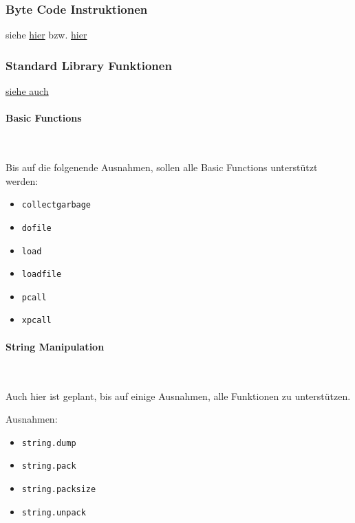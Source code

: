 \documentclass{article}
\let\oldparagraph\paragraph
\renewcommand{\paragraph}[1]{\oldparagraph{#1}\mbox{}\\}
\begin{document}
\subsubsection*{Byte Code Instruktionen}\hypertarget{byte-code-instruktionen}{}\label{byte-code-instruktionen}

siehe \href{https://www.lua.org/source/5.3/lopcodes.h.html}{hier}\newline
bzw. \href{https://github.com/dibyendumajumdar/ravi/blob/master/readthedocs/lua\_bytecode\_reference.rst}{hier}

\subsubsection*{Standard Library Funktionen}\hypertarget{standard-library-funktionen}{}\label{standard-library-funktionen}

\href{https://www.lua.org/manual/5.3/manual.html\#6}{siehe auch}

\paragraph{Basic Functions}\hypertarget{basic-functions}{}\label{basic-functions}

Bis auf die folgenende Ausnahmen, sollen alle Basic Functions unterstützt werden:

\begin{multicols}{2}
\begin{itemize}
\item \texttt{collectgarbage}
\item \texttt{dofile}
\item \texttt{load}
\item \texttt{loadfile}
\item \texttt{pcall}
\item \texttt{xpcall}
\end{itemize}
\end{multicols}

\pagebreak

\paragraph{String Manipulation}\hypertarget{string-manipulation}{}\label{string-manipulation}

Auch hier ist geplant, bis auf einige Ausnahmen, alle Funktionen zu unterstützen.

Ausnahmen:

\begin{multicols}{2}
\begin{itemize}
\item \texttt{string.dump}
\item \texttt{string.pack}
\item \texttt{string.packsize}
\item \texttt{string.unpack}
\end{itemize}
\end{multicols}
\end{document}

